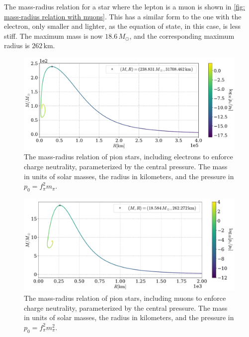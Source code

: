The mass-radius relation for a star where the lepton is a muon is shown in \autoref{fig: mass-radius relation with muons}.
This has a similar form to the one with the electron, only smaller and lighter, as the equation of state, in this case, is less stiff.
The maximum mass is now $18.6\, M_\odot $, and the corresponding maximum radius is $ 262 \,\text{km}$.

\begin{figure}[!htb]
    \centering
    \includegraphics[width=.85\textwidth]{../scripts/figurer/pion_star/mass_radius__e.pdf}
    \caption{
        The mass-radius relation of pion stars, including electrons to enforce charge neutrality, parameterized by the central pressure.
        The mass in units of solar masses, the radius in kilometers, and the pressure in $p_0 = f_\pi^2 m_\pi$.
        }
        \label{fig: mass-radius relation with electrons}
\end{figure}

\begin{figure}[!htb]
    \centering
    \includegraphics[width=.85\textwidth]{../scripts/figurer/pion_star/mass_radius__mu.pdf}
    \caption{
        The mass-radius relation of pion stars, including muons to enforce charge neutrality, parameterized by the central pressure.
        The mass in units of solar masses, the radius in kilometers, and the pressure in $p_0 = f_\pi^2 m_\pi^2$.
        }
        \label{fig: mass-radius relation with muons}
\end{figure}


\FloatBarrier
